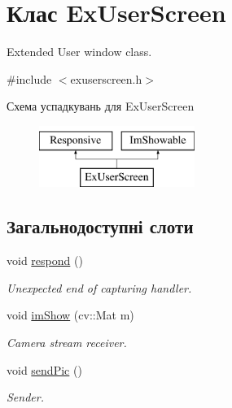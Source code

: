 \hypertarget{classExUserScreen}{\section{Клас Ex\-User\-Screen}
\label{classExUserScreen}
}


Extended User window class.  




{\ttfamily \#include $<$exuserscreen.\-h$>$}

Схема успадкувань для Ex\-User\-Screen\begin{figure}[H]
\begin{center}
\leavevmode
\includegraphics[height=2.000000cm]{classExUserScreen}
\end{center}
\end{figure}
\subsection*{Загальнодоступні слоти}
\begin{DoxyCompactItemize}
\item 
\hypertarget{classExUserScreen_a02023bde7f3823dbeb460fddcef8341e}{void \hyperlink{classExUserScreen_a02023bde7f3823dbeb460fddcef8341e}{respond} ()}\label{classExUserScreen_a02023bde7f3823dbeb460fddcef8341e}

\begin{DoxyCompactList}\small\item\em Unexpected end of capturing handler. \end{DoxyCompactList}\item 
\hypertarget{classExUserScreen_ad479165ffd920e5ef152e5aff1ed4d6b}{void \hyperlink{classExUserScreen_ad479165ffd920e5ef152e5aff1ed4d6b}{im\-Show} (cv\-::\-Mat m)}\label{classExUserScreen_ad479165ffd920e5ef152e5aff1ed4d6b}

\begin{DoxyCompactList}\small\item\em Camera stream receiver. \end{DoxyCompactList}\item 
\hypertarget{classExUserScreen_a0c6af1cd09fc3301f9195f162d417c85}{void \hyperlink{classExUserScreen_a0c6af1cd09fc3301f9195f162d417c85}{send\-Pic} ()}\label{classExUserScreen_a0c6af1cd09fc3301f9195f162d417c85}

\begin{DoxyCompactList}\small\item\em Sender. \end{DoxyCompactList}\end{DoxyCompactItemize}
